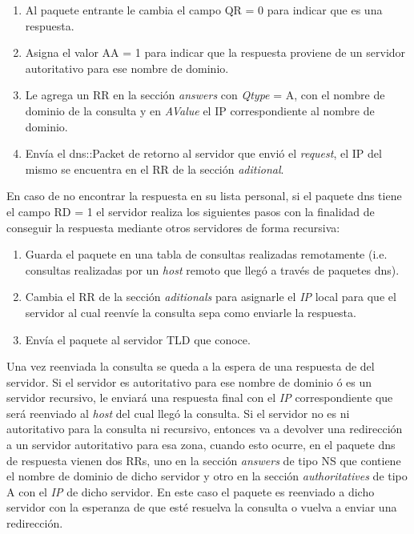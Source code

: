 \documentclass[10pt,a4paper]{article}
\begin{document}
\begin{enumerate}
\item Al paquete entrante le cambia el campo QR = 0 para indicar que es una respuesta.
\item Asigna el valor AA = 1 para indicar que la respuesta proviene de un servidor autoritativo para ese nombre de dominio.
\item Le agrega un RR en la sección \textit{answers} con \textit{Qtype} = A, con el nombre de dominio de la consulta y en \textit{AValue} el IP correspondiente al nombre de dominio.
\item Envía el dns::Packet de retorno al servidor que envió el \textit{request}, el IP del mismo se encuentra en el RR de la sección \textit{aditional}.
\end{enumerate}

En caso de no encontrar la respuesta en su lista personal, si el paquete dns tiene el campo RD = 1 el servidor realiza los siguientes pasos con la finalidad de conseguir la respuesta mediante otros servidores de forma recursiva:

\begin{enumerate}
\item Guarda el paquete en una tabla de consultas realizadas remotamente (i.e. consultas realizadas por un \textit{host} remoto que llegó a través de paquetes dns).
\item Cambia el RR de la sección \textit{aditionals} para asignarle el \textit{IP} local para que el servidor al cual reenvíe la consulta sepa como enviarle la respuesta.
\item Envía el paquete al servidor TLD que conoce.
\end{enumerate}

Una vez reenviada la consulta se queda a la espera de una respuesta de del servidor. Si el servidor es autoritativo para ese nombre de dominio ó es un servidor recursivo, le enviará una respuesta final con el \textit{IP} correspondiente que será reenviado al \textit{host} del cual llegó la consulta. Si el servidor no es ni autoritativo para la consulta ni recursivo, entonces va a devolver una redirección a un servidor autoritativo para esa zona, cuando esto ocurre, en el paquete dns de respuesta vienen dos RRs, uno en la sección \textit{answers} de tipo NS que contiene el nombre de dominio de dicho servidor y otro en la sección \textit{authoritatives} de tipo A con el \textit{IP} de dicho servidor. En este caso el paquete es reenviado a dicho servidor con la esperanza de que esté resuelva la consulta o vuelva a enviar una redirección. \\
\end{document}
